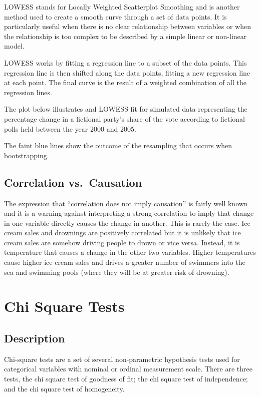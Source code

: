 \documentclass[
]{book}
\begin{document}
LOWESS stands for Locally Weighted Scatterplot Smoothing and is another method used to create a smooth curve through a set of data points. It is particularly useful when there is no clear relationship between variables or when the relationship is too complex to be described by a simple linear or non-linear model.

LOWESS works by fitting a regression line to a subset of the data points. This regression line is then shifted along the data points, fitting a new regression line at each point. The final curve is the result of a weighted combination of all the regression lines.

The plot below illustrates and LOWESS fit for simulated data representing the percentage change in a fictional party's share of the vote according to fictional polls held between the year 2000 and 2005.

The faint blue lines show the outcome of the resampling that occurs when bootstrapping.

\hypertarget{correlation-vs.-causation}{%
\section{Correlation vs.~Causation}\label{correlation-vs.-causation}}

The expression that ``correlation does not imply causation'' is fairly well known and it is a warning against interpreting a strong correlation to imply that change in one variable directly causes the change in another. This is rarely the case. Ice cream sales and drownings are positively correlated but it is unlikely that ice cream sales are somehow driving people to drown or vice versa. Instead, it is temperature that causes a change in the other two variables. Higher temperatures cause higher ice cream sales and drives a greater number of swimmers into the sea and swimming pools (where they will be at greater risk of drowning).

\hypertarget{chisq}{%
\chapter{Chi Square Tests}\label{chisq}}

\hypertarget{description}{%
\section{Description}\label{description}}

Chi-square tests are a set of several non-parametric hypothesis tests used for categorical variables with nominal or ordinal measurement scale. There are three tests, the chi square test of goodness of fit; the chi square test of independence; and the chi square test of homogeneity.
\end{document}
